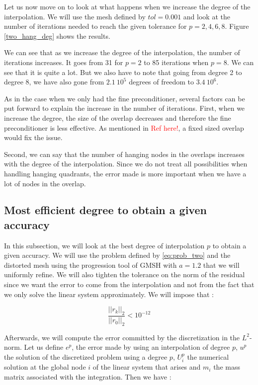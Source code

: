 Let us now move on to look at what happens when we increase the degree of the interpolation. We will use the mesh defined by $tol = 0.001$ and look at the number of iterations needed to reach the given tolerance for $p=2,4,6,8$. Figure \ref{two_hang_deg} shows the results. 

We can see that as we increase the degree of the interpolation, the number of iterations increases. It goes from 31 for $p=2$ to 85 iterations when $p=8$. We can see that it is quite a lot. But we also have to note that going from degree 2 to degree 8, we have also gone from $2.1\:10^5$ degrees of freedom to $3.4\:10^6$.

As in the case when we only had the fine preconditioner, several factors can be put forward to explain the increase in the number of iterations. First, when we increase the degree, the size of the overlap decreases and therefore the fine preconditioner is less effective. As mentioned in \textcolor{red}{Ref here!}, a fixed sized overlap would fix the issue. 

Second, we can say that the number of hanging nodes in the overlaps increases with the degree of the interpolation. Since we do not treat all possibilities when handling hanging quadrants, the error made is more important when we have a lot of nodes in the overlap.


\subsection{Most efficient degree to obtain a given accuracy}

In this subsection, we will look at the best degree of interpolation $p$ to obtain a given accuracy. We will use the problem defined by \ref{eq:prob_two} and the distorted mesh using the progression tool of GMSH with $a=1.2$ that we will uniformly refine. We will also tighten the tolerance on the norm of the residual since we want the error to come from the interpolation and not from the fact that we only solve the linear system approximately. We will impose that : 

$$ \frac{||r_k||_2}{||r_0||_2} < 10^{-12} $$

Afterwards, we will compute the error committed by the discretization in the $L^2$-norm. Let us define $e^p$, the error made by using an interpolation of degree $p$, $u^p$ the solution of the discretized problem using a degree $p$, $U^p_i$ the numerical solution at the global node $i$ of the linear system that arises and $m_i$ the mass matrix associated with the integration. Then we have :  


